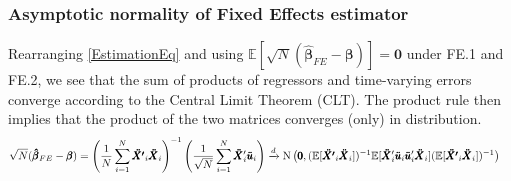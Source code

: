 \subsubsection*{Asymptotic normality of Fixed Effects estimator}
Rearranging \eqref{EstimationEq} and using $\mathbb{E}[\sqrt{N}(\pmb{\hat{\beta}}_{FE}-\pmb{\beta})]=\pmb{0}$ under FE.1 and FE.2, we see that the sum of products of regressors and time-varying errors converge according to the Central Limit Theorem (CLT). The product rule then implies that the product of the two matrices converges (only) in distribution.
\begin{align} 
    \sqrt{N}(\pmb{\hat{\beta}}_{FE}-\pmb{\beta}) &=  \left( \frac{1}{N} \sum_{i=1}^N {\pmb{\ddot{X'}}_{i} \pmb{\ddot{X}}_{i} } \right) ^{-1} \left( \frac{1}{\sqrt{N}} \sum_{i=1}^N {\pmb{\ddot{X}}_i' \pmb{\ddot{u}}_i} \right) \notag
    \xrightarrow{d} \text{N} \left(\pmb{0},
(\mathbb{E}[\pmb{\ddot{X'}}_{i} \pmb{\ddot{X}}_{i}])^{-1} \mathbb{E}[\pmb{\ddot{X}}_i' \pmb{\ddot{u}}_i\pmb{\ddot{u}}_i'\pmb{\ddot{X}}_i] (\mathbb{E}[\pmb{\ddot{X'}}_{i} \pmb{\ddot{X}}_{i}])^{-1} \right)
\end{align}



